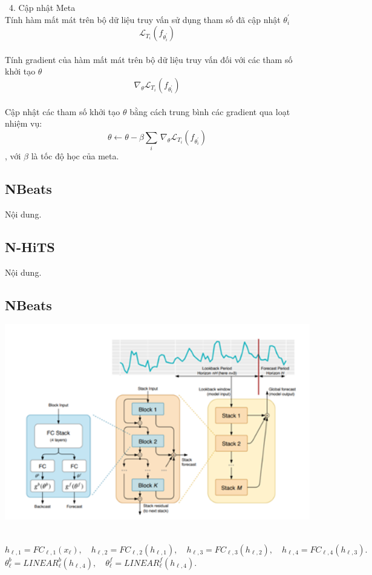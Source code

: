         \indent\textbullet\ 4. Cập nhật Meta\\
            Tính hàm mất mát trên bộ dữ liệu truy vấn sử dụng tham số đã cập nhật \(\theta_i^\prime\) \\ 
            \[\mathcal{L}_{T_i}\left(f_{\theta_i^\prime}\right)\]\\
            Tính gradient của hàm mất mát trên bộ dữ liệu truy vấn đối với các tham số khởi tạo \(\theta\) \\
            \[\nabla_\theta\mathcal{L}_{T_i}\left(f_{\theta_i^\prime}\right)\] \\
            Cập nhật các tham số khởi tạo \(\theta\) bằng cách trung bình các gradient qua loạt nhiệm vụ: \\
            \[\theta \gets \theta - \beta \sum_{i} \, \nabla_{\theta} \mathcal{L}_{T_{i}} \left( f_{\theta_{i}^{\prime}} \right)\]
            , với \(\beta\) là tốc độ học của meta.


\subsection{NBeats}
Nội dung.

\subsection{N-HiTS}
Nội dung.

\subsection{NBeats}
\begin{minipage}{0.45\textwidth}
\centering
\includegraphics[width=1\textwidth]{resources/chapter-4/nbeats-1.png}
\end{minipage}
\\
\({h}_{\ell,1} = FC_{\ell,1}({x}_{\ell}), \quad {h}_{\ell,2} = FC_{\ell,2}({h}_{\ell,1}), \quad {h}_{\ell,3} = FC_{\ell,3}({h}_{\ell,2}), \quad {h}_{\ell,4} = FC_{\ell,4}({h}_{\ell,3}).\) \\
\(\theta^b_{\ell} = LINEAR_{\ell}^{b}({h}_{\ell,4}), \quad \theta^f_{\ell} = LINEAR_{\ell}^{f}({h}_{\ell,4}).\) \\

